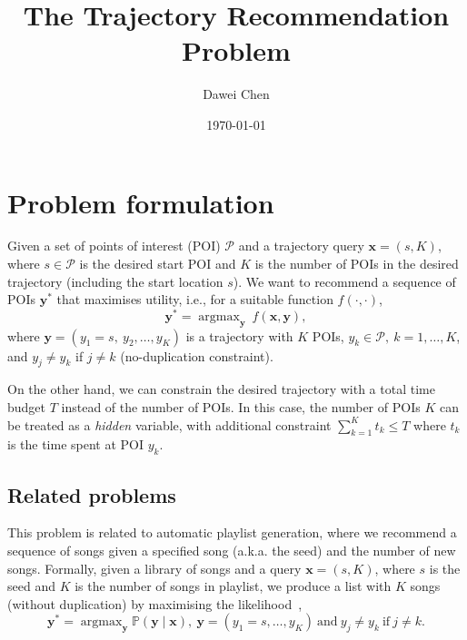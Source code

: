 \documentclass[9pt]{extarticle}
\title{The Trajectory Recommendation Problem}
\author{Dawei Chen}
\date{\today}
\DeclareMathOperator*{\argmax}{argmax}
\begin{document}
\maketitle


\section{Problem formulation}
\label{sec:formulation}

Given a set of points of interest (POI) $\mathcal{P}$ and a trajectory query $\mathbf{x} = (s, K)$,
where $s \in \mathcal{P}$ is the desired start POI and $K$ is the number of POIs in the desired trajectory (including the start location $s$).
We want to recommend a sequence of POIs $\mathbf{y}^*$ that maximises utility, i.e., for a suitable function $f(\cdot,\cdot)$,
\begin{equation*}
\mathbf{y}^* = \argmax_{\mathbf{y}}~f(\mathbf{x}, \mathbf{y}),
\end{equation*}
where $\mathbf{y} = (y_1 = s,~ y_2, \dots, y_K)$ is a trajectory with $K$ POIs, $y_k \in \mathcal{P},~ k=1,\dots,K$, and $y_j \ne y_k$ if $j \ne k$ 
(no-duplication constraint).

On the other hand, we can constrain the desired trajectory with a total time budget $T$ instead of the number of POIs.
In this case, the number of POIs $K$ can be treated as a \emph{hidden} variable, with additional constraint $\sum_{k=1}^K t_k \le T$ 
where $t_k$ is the time spent at POI $y_k$.



\subsection{Related problems}
\label{sec:related}

This problem is related to automatic playlist generation, 
where we recommend a sequence of songs given a specified song (a.k.a. the seed) and the number of new songs.
Formally, given a library of songs and a query $\mathbf{x} = (s, K)$, where $s$ is the seed and $K$ is the number of songs in playlist,
we produce a list with $K$ songs (without duplication) by maximising the likelihood~\cite{chen2012playlist},
\begin{equation*}
\mathbf{y}^* = \argmax_{\mathbf{y}} \mathbb{P}(\mathbf{y} \mid \mathbf{x}),~ \mathbf{y} = (y_1=s,\dots,y_K) ~\text{and}~ y_j \ne y_k ~\text{if}~ j \ne k.
\end{equation*}
\end{document}
